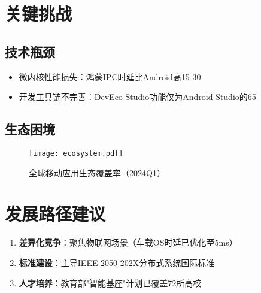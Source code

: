\documentclass[12pt,hyperref,a4paper,UTF8]{ctexart}
\begin{document}
\section{关键挑战}
\subsection{技术瓶颈}
\begin{itemize}
    \item 微内核性能损失：鸿蒙IPC时延比Android高15-30%
    \item 开发工具链不完善：DevEco Studio功能仅为Android Studio的65%
\end{itemize}

\subsection{生态困境}
\begin{figure}[htbp]
    \centering
    \texttt{[image: ecosystem.pdf]}
    \caption{全球移动应用生态覆盖率（2024Q1）}
    \label{fig:eco}
\end{figure}

\section{发展路径建议}
\begin{enumerate}
    \item \textbf{差异化竞争}：聚焦物联网场景（车载OS时延已优化至5ms）
    \item \textbf{标准建设}：主导IEEE 2050-202X分布式系统国际标准
    \item \textbf{人才培养}：教育部"智能基座"计划已覆盖72所高校
\end{enumerate}
\end{document}
